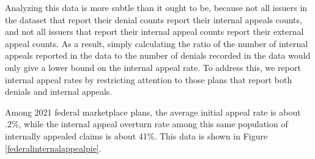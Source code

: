 \documentclass[12pt, a4paper,twoside,parskip=full]{report}
\theoremstyle{plain} %
\theoremstyle{definition} %
\theoremstyle{remark} %
\numberwithin{equation}{chapter}
\begin{document}
		Analyzing this data is more subtle than it ought to be, because not all issuers in the dataset that report their denial counts report their internal appeals counts, and not all issuers that report their internal appeal counts report their external appeal counts. As a result, simply calculating the ratio of the number of internal appeals reported in the data to the number of denials recorded in the data would only give a lower bound on the internal appeal rate. To address this, we report internal appeal rates by restricting attention to those plans that report both denials and internal appeals.
		
		Among 2021 federal marketplace plans, the average initial appeal rate is about .2\%, while the internal appeal overturn rate among this same population of internally appealed claims is about 41\%. This data is shown in Figure \ref{federalinternalappealpie}.
		
	
	
\end{document}
